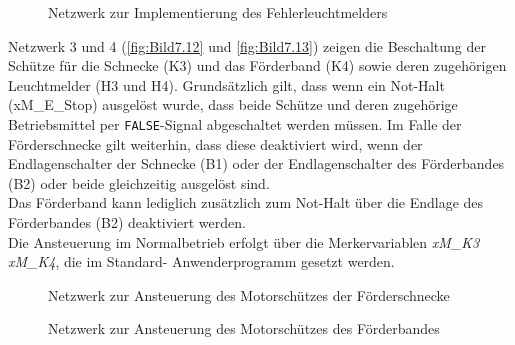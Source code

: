 \begin{figure}[H]
   \centering
   \caption[Fehlerleuchtmelder]{Netzwerk zur Implementierung des Fehlerleuchtmelders}
   \label{fig:Bild7.11}
\end{figure}

Netzwerk 3 und 4 (\autoref{fig:Bild7.12} und \autoref{fig:Bild7.13}) zeigen die Beschaltung der Schütze für die Schnecke (K3) und das Förderband (K4) sowie deren zugehörigen Leuchtmelder (H3 und H4). Grundsätzlich gilt, dass wenn ein Not-Halt (xM\_E\_Stop) ausgelöst wurde, dass beide Schütze und deren zugehörige Betriebsmittel per \texttt{FALSE}-Signal abgeschaltet werden müssen. Im Falle der Förderschnecke gilt weiterhin, dass diese deaktiviert wird, wenn der Endlagenschalter der Schnecke (B1) oder der Endlagenschalter des Förderbandes (B2) oder beide gleichzeitig ausgelöst sind. \\
Das Förderband kann lediglich zusätzlich zum Not-Halt über die Endlage des Förderbandes (B2) deaktiviert werden. \\
Die Ansteuerung im Normalbetrieb erfolgt über die Merkervariablen \textit{xM\_K3} \bzw \textit{xM\_K4}, die im Standard- Anwenderprogramm gesetzt werden.

\begin{figure}[H]
   \centering
   \caption[Motorschütz Förderschnecke]{Netzwerk zur Ansteuerung des Motorschützes der Förderschnecke}
   \label{fig:Bild7.12}
\end{figure}

\begin{figure}[H]
   \centering
   \caption[Motorschütz Förderband]{Netzwerk zur Ansteuerung des Motorschützes des Förderbandes}
   \label{fig:Bild7.13}
\end{figure}

